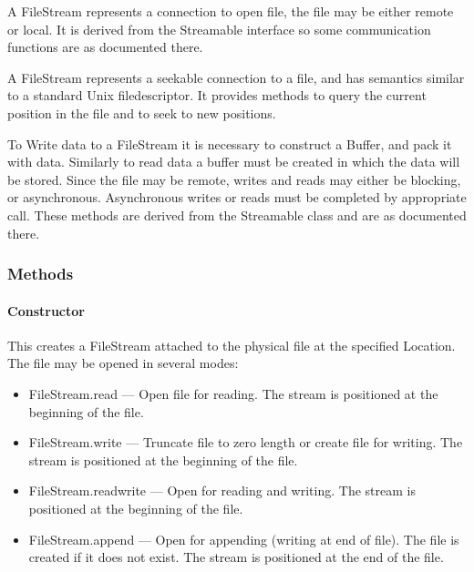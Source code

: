 \documentclass[$Date: 2003/06/26 19:29:31 $]{glabarticle}
\begin{document}

A FileStream represents a connection to open file, the file may be
either remote or local.  It is derived from the Streamable interface so
some communication functions are as documented there.

A FileStream represents a seekable connection to a file, and has
semantics similar to a standard Unix filedescriptor.  It provides
methods to query the current position in the file and to seek to new positions.

To Write data to a FileStream it is necessary to construct a Buffer,
and pack it with data.  Similarly to read data a buffer must be
created in which the data will be stored.  Since the file may be
remote, writes and reads may either be blocking, or asynchronous.
Asynchronous writes or reads must be completed by appropriate call.
These methods are derived from the Streamable class and are as
documented there.


\subsubsection{Methods}

\paragraph{Constructor}

This creates a FileStream attached to the physical file at the
specified Location.  The file may be opened in several modes:

\begin{itemize}

\item[] FileStream.read --- Open file for reading.  The stream is
positioned at the beginning of the file.

\item[] FileStream.write --- Truncate file to zero length or create file
for writing.  The stream is positioned at the beginning of the file.

\item[] FileStream.readwrite --- Open for reading and writing.  The
stream is positioned at the beginning of the file.

\item[] FileStream.append --- Open for appending (writing at end of
file).  The file is created if it does not exist.  The stream is
positioned at the end of the file.\\

\end{itemize}
\end{document}
